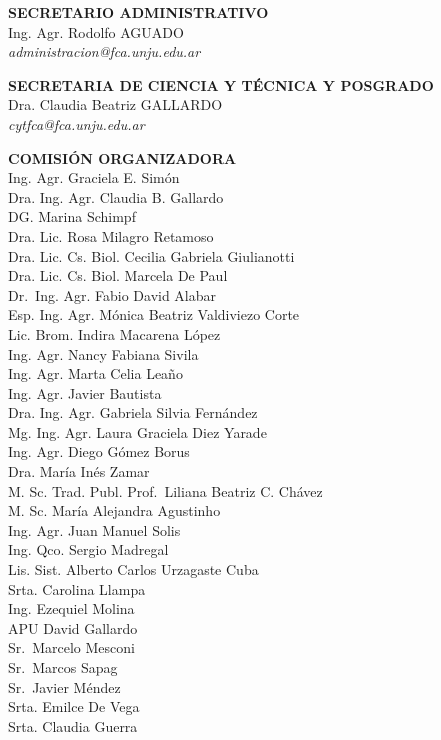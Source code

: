 \documentclass[
  spanish,
  letterpaper,
  DIV=11,
  numbers=noendperiod]{scrreprt}
\begin{document}
\textbf{SECRETARIO ADMINISTRATIVO}\\
Ing. Agr. Rodolfo AGUADO\\
\emph{administracion@fca.unju.edu.ar}

\textbf{SECRETARIA DE CIENCIA Y TÉCNICA Y POSGRADO}\\
Dra. Claudia Beatriz GALLARDO\\
\emph{cytfca@fca.unju.edu.ar}

\textbf{COMISIÓN ORGANIZADORA}\\
Ing. Agr. Graciela E. Simón\\
Dra. Ing. Agr. Claudia B. Gallardo\\
DG. Marina Schimpf\\
Dra. Lic. Rosa Milagro Retamoso\\
Dra. Lic. Cs. Biol. Cecilia Gabriela Giulianotti\\
Dra. Lic. Cs. Biol. Marcela De Paul\\
Dr.~Ing. Agr. Fabio David Alabar\\
Esp. Ing. Agr. Mónica Beatriz Valdiviezo Corte\\
Lic. Brom. Indira Macarena López\\
Ing. Agr. Nancy Fabiana Sivila\\
Ing. Agr. Marta Celia Leaño\\
Ing. Agr. Javier Bautista\\
Dra. Ing. Agr. Gabriela Silvia Fernández\\
Mg. Ing. Agr. Laura Graciela Diez Yarade\\
Ing. Agr. Diego Gómez Borus\\
Dra. María Inés Zamar\\
M. Sc. Trad. Publ. Prof.~Liliana Beatriz C. Chávez\\
M. Sc. María Alejandra Agustinho\\
Ing. Agr. Juan Manuel Solis\\
Ing. Qco. Sergio Madregal\\
Lis. Sist. Alberto Carlos Urzagaste Cuba\\
Srta. Carolina Llampa\\
Ing. Ezequiel Molina\\
APU David Gallardo\\
Sr.~Marcelo Mesconi\\
Sr.~Marcos Sapag\\
Sr.~Javier Méndez\\
Srta. Emilce De Vega\\
Srta. Claudia Guerra
\end{document}
